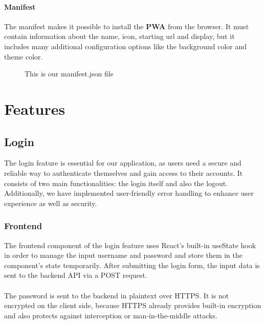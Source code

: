 \documentclass[a4paper,12pt]{report}
\begin{document}
\subsubsection{Manifest}
The manifest makes it possible to install the \textbf{PWA} from the browser. It must contain information about the name, icon, starting url and display, but it includes many additional configuration options like the background color and theme color.\parencite{mdn-pwa-installation}
\begin{figure}[H]
	\caption{This is our manifest.json file}
	\label{fig:example-maifest}
\end{figure}


\chapter{Features}
\section{Login}
The login feature is essential for our application, as users need a secure and reliable way to authenticate themselves and gain access to their accounts. It consists of two main functionalities: the login itself and also the logout. Additionally, we have implemented user-friendly error handling to enhance user experience as well as security.
\subsection{Frontend}
The frontend component of the login feature uses React's built-in useState hook in order to manage the input username and password and store them in the component's state temporarily. After submitting the login form, the input data is sent to the backend API via a POST request.\\\\
The password is sent to the backend in plaintext over HTTPS. It is not encrypted on the client side, because HTTPS already provides built-in encryption and also protects against interception or man-in-the-middle attacks.
\end{document}
